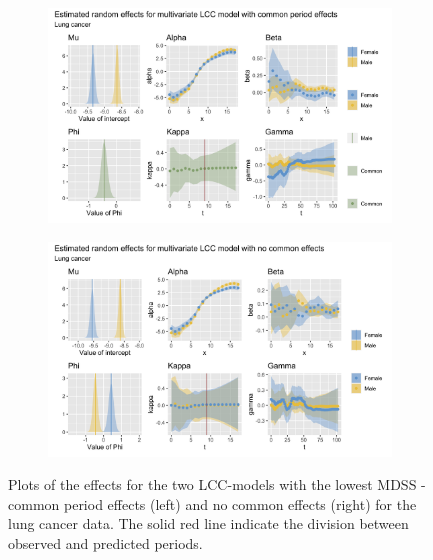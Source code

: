 \begin{figure}[h!]
    \centering
    \begin{subfigure}[b]{.45\linewidth}
        \includegraphics[width=\linewidth]{real-data/real-data-multivariate/Figures/effects-LCC-common-period-lung.png}
    \end{subfigure}
    \begin{subfigure}[b]{.45\linewidth}
        \includegraphics[width=\linewidth]{real-data/real-data-multivariate/Figures/effects-LCC-no-common-lung.png}
    \end{subfigure}
    \caption{Plots of the effects for the two LCC-models with the lowest MDSS - common period effects (left) and no common effects (right) for the lung cancer data. The solid red line indicate the division between observed and predicted periods. }
    \label{fig:effects-LCC-lung}
\end{figure}

